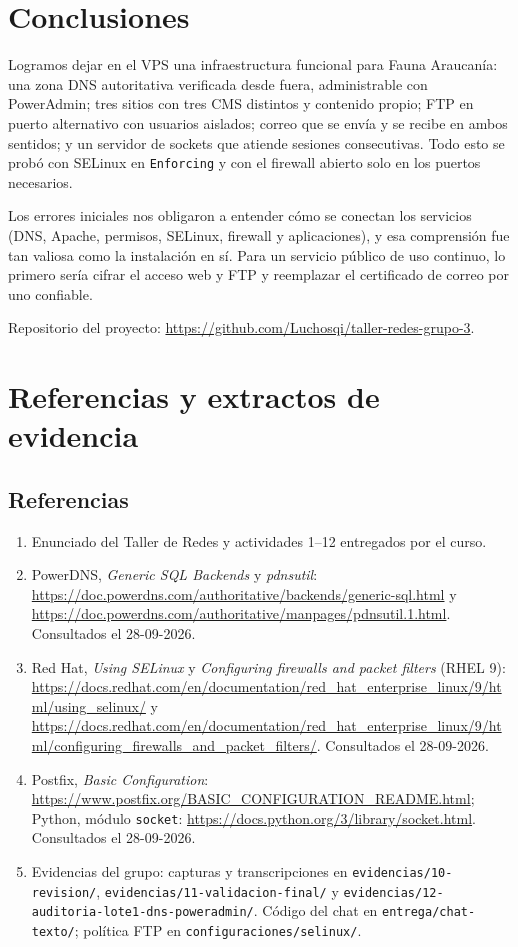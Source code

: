 \documentclass[11pt,a4paper]{article}
\newcommand{\ruta}[1]{\nolinkurl{#1}}
\begin{document}
\section{Conclusiones}
Logramos dejar en el VPS una infraestructura funcional para Fauna Araucanía: una zona DNS autoritativa verificada desde fuera, administrable con PowerAdmin; tres sitios con tres CMS distintos y contenido propio; FTP en puerto alternativo con usuarios aislados; correo que se envía y se recibe en ambos sentidos; y un servidor de sockets que atiende sesiones consecutivas. Todo esto se probó con SELinux en \texttt{Enforcing} y con el firewall abierto solo en los puertos necesarios.

Los errores iniciales nos obligaron a entender cómo se conectan los servicios (DNS, Apache, permisos, SELinux, firewall y aplicaciones), y esa comprensión fue tan valiosa como la instalación en sí. Para un servicio público de uso continuo, lo primero sería cifrar el acceso web y FTP y reemplazar el certificado de correo por uno confiable.

Repositorio del proyecto: \url{https://github.com/Luchosqi/taller-redes-grupo-3}.

\section{Referencias y extractos de evidencia}
\subsection{Referencias}
\begin{enumerate}\setlength\itemsep{0pt}
\item Enunciado del Taller de Redes y actividades 1--12 entregados por el curso.
\item PowerDNS, \emph{Generic SQL Backends} y \emph{pdnsutil}: \url{https://doc.powerdns.com/authoritative/backends/generic-sql.html} y \url{https://doc.powerdns.com/authoritative/manpages/pdnsutil.1.html}. Consultados el 28-09-2026.
\item Red Hat, \emph{Using SELinux} y \emph{Configuring firewalls and packet filters} (RHEL 9): \url{https://docs.redhat.com/en/documentation/red_hat_enterprise_linux/9/html/using_selinux/} y \url{https://docs.redhat.com/en/documentation/red_hat_enterprise_linux/9/html/configuring_firewalls_and_packet_filters/}. Consultados el 28-09-2026.
\item Postfix, \emph{Basic Configuration}: \url{https://www.postfix.org/BASIC_CONFIGURATION_README.html}; Python, módulo \texttt{socket}: \url{https://docs.python.org/3/library/socket.html}. Consultados el 28-09-2026.
\item Evidencias del grupo: capturas y transcripciones en \ruta{evidencias/10-revision/}, \ruta{evidencias/11-validacion-final/} y \ruta{evidencias/12-auditoria-lote1-dns-poweradmin/}. Código del chat en \ruta{entrega/chat-texto/}; política FTP en \ruta{configuraciones/selinux/}.
\end{enumerate}
\end{document}
